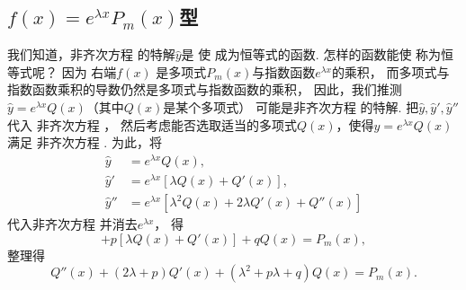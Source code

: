 \subsection{\texorpdfstring{\(f(x) = e^{\lambda x} P_m(x)\)型}{第一类：指数函数与多项式函数的乘积}}
我们知道，非齐次方程  的特解\(\hat{y}\)是
使  成为恒等式的函数.
怎样的函数能使  称为恒等式呢？
因为  右端\(f(x)\)
是多项式\(P_m(x)\)与指数函数\(e^{\lambda x}\)的乘积，
而多项式与指数函数乘积的导数仍然是多项式与指数函数的乘积，
因此，我们推测\(\hat{y} = e^{\lambda x} Q(x)\)（其中\(Q(x)\)是某个多项式）
可能是非齐次方程  的特解.
把\(\hat{y}, \hat{y}', \hat{y}''\)代入
非齐次方程 ，
然后考虑能否选取适当的多项式\(Q(x)\)，使得\(\hat{y} = e^{\lambda x} Q(x)\)满足
非齐次方程 .
为此，将\begin{align*}
	\hat{y} &= e^{\lambda x} Q(x), \\
	\hat{y}' &= e^{\lambda x} [ \lambda Q(x) + Q'(x) ], \\
	\hat{y}'' &= e^{\lambda x} [ \lambda^2 Q(x) + 2\lambda Q'(x) + Q''(x) ]
\end{align*}
代入非齐次方程 
并消去\(e^{\lambda x}\)，
得\begin{equation*}
	[ \lambda^2 Q(x) + 2\lambda Q'(x) + Q''(x) ]
	+ p [ \lambda Q(x) + Q'(x) ]
	+ q Q(x)
	= P_m(x),
\end{equation*}
整理得\begin{equation}\label{equation:微分方程.常系数非齐次线性微分方程.中间步骤1}
	Q''(x) + (2\lambda+p) Q'(x) + (\lambda^2+p\lambda+q) Q(x) = P_m(x).
\end{equation}

